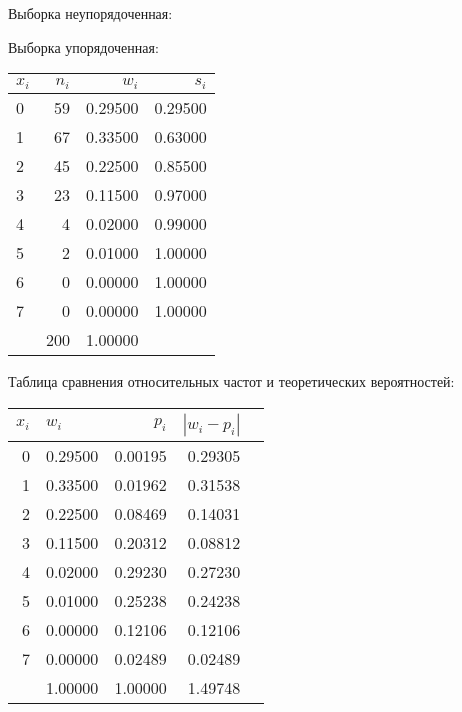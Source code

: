 Выборка неупорядоченная:\newline

\newpage
Выборка упорядоченная:\newline

\newpage


\begin{center}
\begin{tabular}{| l | r | r | r |}
\hline
$x_i$ & $n_i$ & $w_i$ & $s_i$ \\\hline
0 & 59 & 0.29500 & 0.29500 \\\hline
1 & 67 & 0.33500 & 0.63000 \\\hline
2 & 45 & 0.22500 & 0.85500 \\\hline
3 & 23 & 0.11500 & 0.97000 \\\hline
4 & 4 & 0.02000 & 0.99000 \\\hline
5 & 2 & 0.01000 & 1.00000 \\\hline
6 & 0 & 0.00000 & 1.00000 \\\hline
7 & 0 & 0.00000 & 1.00000 \\\hline
  & 200 & 1.00000 &   \\\hline
\end{tabular}
\end{center}

\newline

\newline
Таблица сравнения относительных частот и теоретических вероятностей:\newline
\begin{center}
\begin{tabular}{| r | l | r | r | r |}
\hline
$x_i$ & $w_i$ & $p_i$ & $|w_i-p_i|$ \\\hline
0 & 0.29500 & 0.00195 & 0.29305 \\\hline
1 & 0.33500 & 0.01962 & 0.31538 \\\hline
2 & 0.22500 & 0.08469 & 0.14031 \\\hline
3 & 0.11500 & 0.20312 & 0.08812 \\\hline
4 & 0.02000 & 0.29230 & 0.27230 \\\hline
5 & 0.01000 & 0.25238 & 0.24238 \\\hline
6 & 0.00000 & 0.12106 & 0.12106 \\\hline
7 & 0.00000 & 0.02489 & 0.02489 \\\hline
  & 1.00000 & 1.00000 & 1.49748 \\\hline
\end{tabular}
\end{center}
